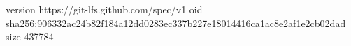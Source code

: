 version https://git-lfs.github.com/spec/v1
oid sha256:906332ac24b82f184a12dd0283ec337b227e18014416ca1ac8e2af1e2cb02dad
size 437784
